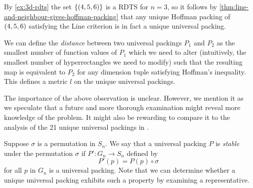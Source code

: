 By \cref{ex:3d-rdts} the set $\left\{ \left( 4, 5, 6 \right) \right\}$ is a RDTS for $n = 3$, so it follows by \cref{thm:line-and-neighbour-gives-hoffman-packing} that any unique Hoffman packing of $\left( 4, 5, 6 \right)$ satisfying the Line criterion  is in fact a unique universal packing.


\noindent We can define the \textit{distance} between two universal packings $P_1$ and $P_2$ as the smallest number of function values of $P_1$ which we need to alter (intuitively, the smallest number of hyperrectangles we need to modify) such that the resulting map is equivalent to $P_2$ for any dimension tuple satisfying Hoffman's inequality. This defines a metric $l$ on the unique universal packings.


\noindent The importance of the above observation is unclear. However, we mention it as we speculate that a future and more thorough examination might reveal more knowledge of the problem. It might also be rewarding to compare it to the analysis of the 21 unique universal packings in \cite[p. 913--915]{berlekamp_conway_guy_2004}.

Suppose $\sigma$ is a permutation in $S_n$. We say that a universal packing $P$ is \textit{stable} under the permutation $\sigma$ if $P'\colon G_n \to S_n$ defined by
\[
P'(p) = P(p) \circ \sigma
\]
for all $p$ in $G_n$ is a universal packing. Note that we can determine whether a unique universal packing exhibits such a property by examining a representative.

